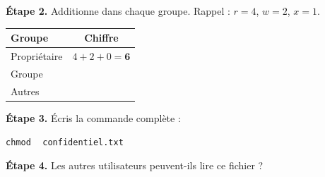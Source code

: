\textbf{Étape 2.} Additionne dans chaque groupe. Rappel : $r = 4$, $w = 2$, $x = 1$.

\bigskip

\begin{center}
\begin{tabular}{|l|c|}
\hline
\textbf{Groupe} & \textbf{Chiffre} \\
\hline
Propriétaire & $4 + 2 + 0 = \mathbf{6}$ \\
\hline
Groupe & \dotfill \\
\hline
Autres & \dotfill \\
\hline
\end{tabular}
\end{center}

\bigskip

\textbf{Étape 3.} Écris la commande complète :

\medskip
\texttt{chmod }\,\dotfill\, \texttt{confidentiel.txt}

\bigskip

\textbf{Étape 4.} Les autres utilisateurs peuvent-ils lire ce fichier ?

\medskip
\begin{center}
 \qquad {}
\end{center}
